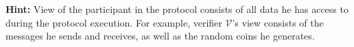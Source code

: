 \documentclass[../../book.tex]{subfiles}
\begin{document}
\textbf{Hint:} View of the participant in the protocol consists of all data he
has access to during the protocol execution. For example, verifier
$\mathcal{V}$'s view consists of the messages he sends and receives, as well as
the random coins he generates.

\end{document}
